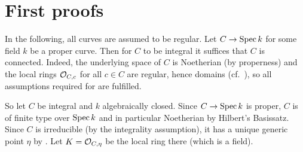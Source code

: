 \documentclass[a4paper,parskip=half,numbers=enddot, DIV=12]{scrreprt}
\begin{document}
\section{First proofs}
In the following, all curves are assumed to be regular. Let $C\morphism\Spec k$ for some field $k$ be a proper curve. Then for $C$ to be integral it suffices that $C$ is connected. Indeed, the underlying space of $C$ is Noetherian (by properness) and the local rings $\mathcal{O}_{C,c}$ for all $c\in C$ are regular, hence domains (cf.\ \cite[Corollary~3.4.9]{alg2}), so all assumptions required for \cite[Proposition~2.1.4]{alggeo1} are fulfilled.

So let $C$ be integral and $k$ algebraically closed. Since $C\morphism\Spec k$ is proper, $C$ is of finite type over $\operatorname{Spec} k$ and in particular Noetherian by Hilbert's Basissatz. Since $C$ is irreducible (by the integrality assumption), it has a unique generic point $\eta$ by \cite[Fact~2.1.9]{alggeo1}. Let $K=\mathcal{O}_{C,\eta}$ be the local ring there (which is a field). 
\end{document}
